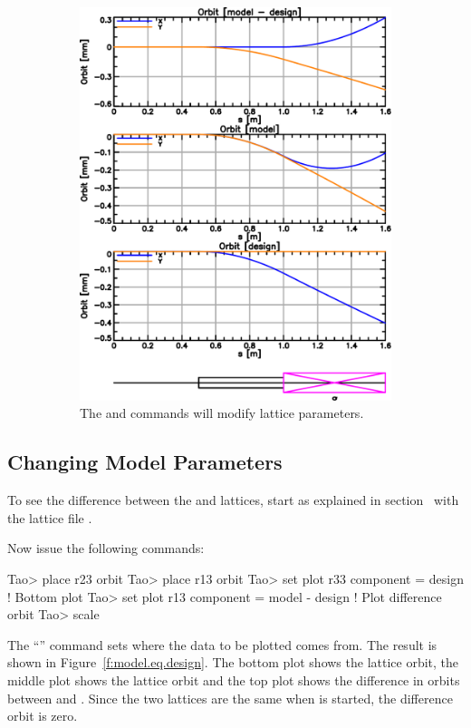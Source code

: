 \documentclass{hitec}     %
\begin{document}
\begin{figure}[tb]
\begin{subfigure}[t]{0.48\textwidth}
    \includegraphics[width=\textwidth]{changed-model.pdf}
    \caption{The  and  commands will modify  lattice parameters.}
    \label{f:changed.model}
  \end{subfigure}
  \caption{}
\end{figure}

\subsection{Changing Model Parameters}
\label{s:change}

To see the difference between the  and  lattices, start \tao as explained in
section~ with the lattice file .

Now issue the following commands:
\begin{code}
Tao> place r23 orbit
Tao> place r13 orbit
Tao> set plot r33 component = design          ! Bottom plot
Tao> set plot r13 component = model - design  ! Plot difference orbit
Tao> scale
\end{code}
The ``'' command sets where the data to be plotted
comes from.  The result is shown in Figure~\ref{f:model.eq.design}. The bottom plot shows the
 lattice orbit, the middle plot shows the  lattice orbit and the top plot shows
the difference in orbits between  and . Since the two lattices are the same
when \tao is started, the difference orbit is zero.
\end{document}
